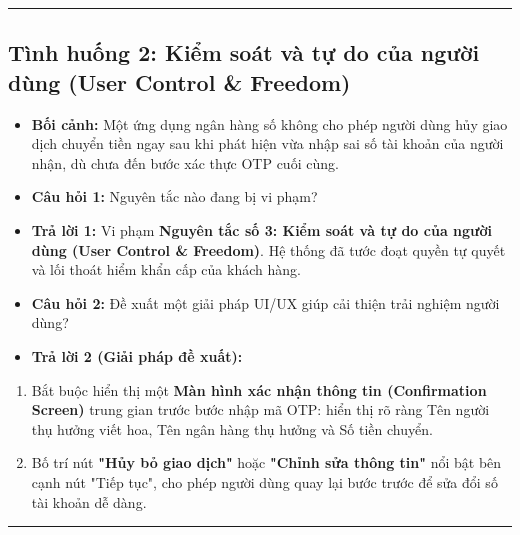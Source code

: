\documentclass[11pt,a4paper,oneside]{report}
\begin{document}
\bigskip\hrule\bigskip

\subsection{Tình huống 2: Kiểm soát và tự do của người dùng (User Control \& Freedom)}
\begin{itemize}[leftmargin=1.5em]
\item \textbf{Bối cảnh:} Một ứng dụng ngân hàng số không cho phép người dùng hủy giao dịch chuyển tiền ngay sau khi phát hiện vừa nhập sai số tài khoản của người nhận, dù chưa đến bước xác thực OTP cuối cùng.
\item \textbf{Câu hỏi 1:} Nguyên tắc nào đang bị vi phạm?
\item \textbf{Trả lời 1:} Vi phạm \textbf{Nguyên tắc số 3: Kiểm soát và tự do của người dùng (User Control \& Freedom)}. Hệ thống đã tước đoạt quyền tự quyết và lối thoát hiểm khẩn cấp của khách hàng.
\item \textbf{Câu hỏi 2:} Đề xuất một giải pháp UI/UX giúp cải thiện trải nghiệm người dùng?
\item \textbf{Trả lời 2 (Giải pháp đề xuất):}
\end{itemize}
\begin{enumerate}[leftmargin=1.5em]
\item Bắt buộc hiển thị một \textbf{Màn hình xác nhận thông tin (Confirmation Screen)} trung gian trước bước nhập mã OTP: hiển thị rõ ràng Tên người thụ hưởng viết hoa, Tên ngân hàng thụ hưởng và Số tiền chuyển.
\item Bố trí nút \textbf{"Hủy bỏ giao dịch"} hoặc \textbf{"Chỉnh sửa thông tin"} nổi bật bên cạnh nút "Tiếp tục", cho phép người dùng quay lại bước trước để sửa đổi số tài khoản dễ dàng.
\end{enumerate}

\bigskip\hrule\bigskip
\end{document}
